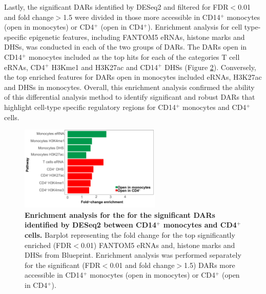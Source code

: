 \begin{figure}[htbp]
\label{figure:QC_quantile_DAR_and_DESeq2_comparison}
\end{figure} 

Lastly, the significant  DARs identified by DESeq2 and filtered for FDR$<$0.01 and fold change$>$1.5 were divided in those more accessible in CD14$^+$ monocytes  (open in monocytes) or CD4$^+$ (open in CD4$^+$). Enrichment analysis for cell type-specific epigenetic features, including FANTOM5 eRNAs, histone marks and DHSs, was conducted in each of the two groups of DARs. The DARs open in CD14$^+$ monocytes included as the top hits for each of the categories T cell eRNAs, CD4$^+$ H3Kme1 and H3K27ac and CD14$^+$ DHSs (Figure \ref{figure:Enrichment_analysis_of_DARs_by_DESeq2}). Conversely, the top enriched features for DARs open in monocytes included eRNAs, H3K27ac and DHSs in monocytes. Overall, this enrichment analysis confirmed the ability of this differential analysis method to identify significant and robust DARs that highlight cell-type specific regulatory regions for CD14$^+$ monocytes and CD4$^+$ cells.


\begin{figure}[htbp]
\centering
\includegraphics[width=0.6\textwidth]{./Results1/pdfs/ATAC_CD4vsCD14_deseq_features_enrichment_barplot}
\caption[Enrichment analysis for the significant DARs identified by DESeq2 between CD14$^+$ monocytes and CD4$^+$ cells.]{\textbf{Enrichment analysis for the for the significant DARs identified by DESeq2 between CD14$^+$ monocytes and CD4$^+$ cells.} Barplot representing the fold change for the top significantly enriched (FDR$<$0.01) FANTOM5 eRNAs and, histone marks and DHSs from Blueprint. Enrichment analysis was performed separately for the significant (FDR$<$0.01 and fold change$>$1.5) DARs more accessible in CD14$^+$ monocytes (open in monocytes) or CD4$^+$ (open in CD4$^+$).}
\label{figure:Enrichment_analysis_of_DARs_by_DESeq2}
\end{figure} 


